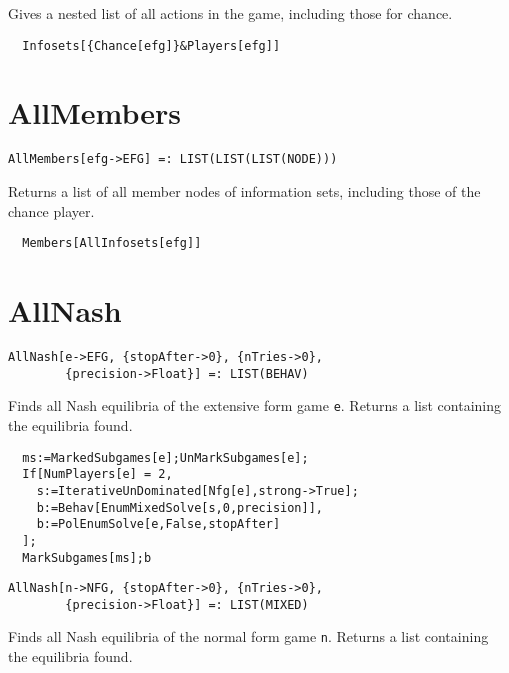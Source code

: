 Gives a nested list of all actions in the game, including those for
chance. 

\udfbody
\begin{verbatim}
  Infosets[{Chance[efg]}&Players[efg]]
\end{verbatim} 


\section*{AllMembers}\label{ExtAllMembers}
\begin{verbatim}
AllMembers[efg->EFG] =: LIST(LIST(LIST(NODE))) 
\end{verbatim}

Returns a list of all member nodes of information sets, including
those of the chance player.

\udfbody
\begin{verbatim}
  Members[AllInfosets[efg]]
\end{verbatim} 


\section*{AllNash}\label{ExtAllNash}
\begin{verbatim}
AllNash[e->EFG, {stopAfter->0}, {nTries->0}, 
        {precision->Float}] =: LIST(BEHAV) 
\end{verbatim}

Finds all Nash equilibria of the extensive form game
\verb+e+.  Returns a list containing the equilibria found.

\udfbody
\begin{verbatim}
  ms:=MarkedSubgames[e];UnMarkSubgames[e];
  If[NumPlayers[e] = 2, 
    s:=IterativeUnDominated[Nfg[e],strong->True];
    b:=Behav[EnumMixedSolve[s,0,precision]],
    b:=PolEnumSolve[e,False,stopAfter]
  ];
  MarkSubgames[ms];b
\end{verbatim} 

\latexignore{\hrule}

\begin{verbatim}
AllNash[n->NFG, {stopAfter->0}, {nTries->0}, 
        {precision->Float}] =: LIST(MIXED) 
\end{verbatim}

Finds all Nash equilibria of the normal form game
\verb+n+.  Returns a list containing the equilibria found.

